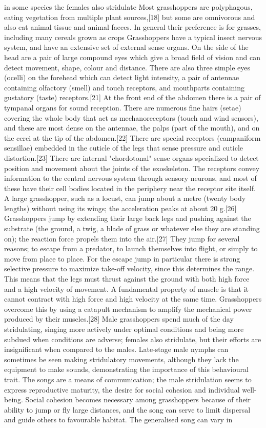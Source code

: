 \documentclass[twoside, 12pt, letterpaper]{report}\usepackage[]{graphicx}\usepackage[]{color}
\begin{document}
\begin{multicols*}{2}
in some species the females also stridulate Most grasshoppers are polyphagous, eating vegetation from multiple plant sources,[18] but some are omnivorous and also eat animal tissue and animal faeces. In general their preference is for grasses, including many cereals grown as crops Grasshoppers have a typical insect nervous system, and have an extensive set of external sense organs. On the side of the head are a pair of large compound eyes which give a broad field of vision and can detect movement, shape, colour and distance. There are also three simple eyes (ocelli) on the forehead which can detect light intensity, a pair of antennae containing olfactory (smell) and touch receptors, and mouthparts containing gustatory (taste) receptors.[21] At the front end of the abdomen there is a pair of tympanal organs for sound reception. There are numerous fine hairs (setae) covering the whole body that act as mechanoreceptors (touch and wind sensors), and these are most dense on the antennae, the palps (part of the mouth), and on the cerci at the tip of the abdomen.[22] There are special receptors (campaniform sensillae) embedded in the cuticle of the legs that sense pressure and cuticle distortion.[23] There are internal "chordotonal" sense organs specialized to detect position and movement about the joints of the exoskeleton. The receptors convey information to the central nervous system through sensory neurons, and most of these have their cell bodies located in the periphery near the receptor site itself. A large grasshopper, such as a locust, can jump about a metre (twenty body lengths) without using its wings; the acceleration peaks at about 20 g.[26] Grasshoppers jump by extending their large back legs and pushing against the substrate (the ground, a twig, a blade of grass or whatever else they are standing on); the reaction force propels them into the air.[27] They jump for several reasons; to escape from a predator, to launch themselves into flight, or simply to move from place to place. For the escape jump in particular there is strong selective pressure to maximize take-off velocity, since this determines the range. This means that the legs must thrust against the ground with both high force and a high velocity of movement. A fundamental property of muscle is that it cannot contract with high force and high velocity at the same time. Grasshoppers overcome this by using a catapult mechanism to amplify the mechanical power produced by their muscles.[28] Male grasshoppers spend much of the day stridulating, singing more actively under optimal conditions and being more subdued when conditions are adverse; females also stridulate, but their efforts are insignificant when compared to the males. Late-stage male nymphs can sometimes be seen making stridulatory movements, although they lack the equipment to make sounds, demonstrating the importance of this behavioural trait. The songs are a means of communication; the male stridulation seems to express reproductive maturity, the desire for social cohesion and individual well-being. Social cohesion becomes necessary among grasshoppers because of their ability to jump or fly large distances, and the song can serve to limit dispersal and guide others to favourable habitat. The generalised song can vary in 
\end{multicols*}
\end{document}
